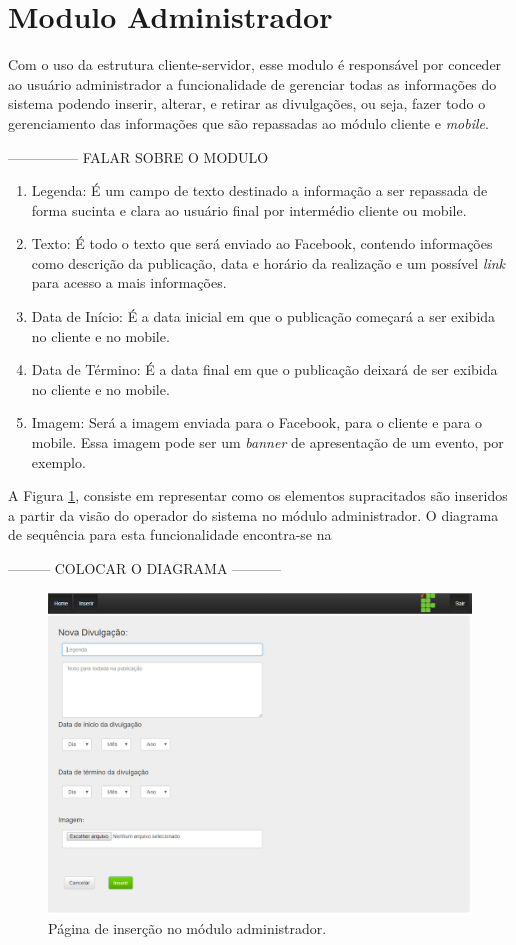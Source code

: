 \section{Modulo Administrador}
Com o uso da estrutura cliente-servidor, esse modulo é responsável por conceder ao usuário administrador a funcionalidade de gerenciar todas as informações do sistema podendo inserir, alterar, e retirar as divulgações, ou seja, fazer todo o gerenciamento das informações que são repassadas ao módulo cliente e \textit{mobile}.

--------------- FALAR SOBRE O MODULO

\begin{enumerate}
   \item Legenda: É um campo de texto destinado a informação a ser repassada de forma sucinta e clara ao usuário final por intermédio cliente ou mobile. 
   \item Texto: É todo o texto que será enviado ao Facebook, contendo informações como descrição da publicação, data e horário da realização e um possível \textit{link} para acesso a mais informações. 
   \item Data de Início: É a data inicial em que o publicação começará a ser exibida no cliente e no mobile.
   \item Data de Término: É a data final em que o publicação deixará de ser exibida no cliente e no mobile.
   \item Imagem: Será a imagem enviada para o Facebook, para o cliente e para o mobile. Essa imagem pode ser um \textit{banner} de apresentação de um evento, por exemplo.
 \end{enumerate}

A Figura \ref{fig:administrador1}, consiste em representar como os elementos supracitados são inseridos a partir da visão do operador do sistema no módulo administrador. O diagrama de sequência para esta funcionalidade encontra-se na
 
 --------- COLOCAR O DIAGRAMA -----------

 
 \begin{figure}[H]
\centering
\includegraphics[scale=0.6]{figuras/administrador1}
\caption{Página de inserção no módulo administrador.}
\label{fig:administrador1}
\end{figure}

